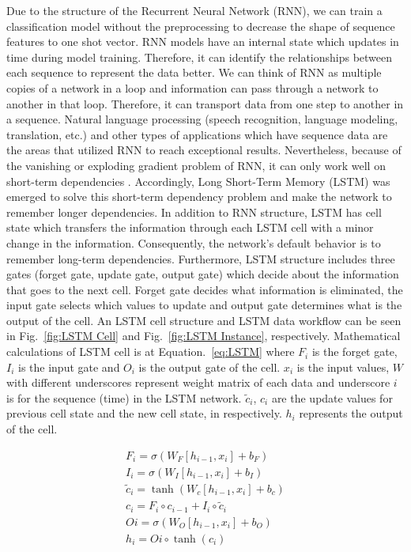 \documentclass[12pt,oneandhalf,chaparabic,lfm,phd,eng,oneside,pntc]{gsufbe}
\begin{document}
Due to the structure of the Recurrent Neural Network (RNN), we can train a classification model without the preprocessing to decrease the shape of sequence features to one shot vector. RNN models have an internal state which updates in time during model training. Therefore, it can identify the relationships between each sequence to represent the data better. We can think of RNN as multiple copies of a network in a loop and information can pass through a network to another in that loop. Therefore, it can transport data from one step to another in a sequence. Natural language processing (speech recognition, language modeling, translation, etc.) and other types of applications which have sequence data are the areas that utilized RNN to reach exceptional results. Nevertheless, because of the vanishing or exploding gradient problem of RNN, it can only work well on short-term dependencies \cite{bengio1994learning}. Accordingly, Long Short-Term Memory (LSTM) \cite{hochreiter1997long} was emerged to solve this short-term dependency problem and make the network to remember longer dependencies. In addition to RNN structure, LSTM has cell state which transfers the information through each LSTM cell with a minor change in the information. Consequently, the network's default behavior is to remember long-term dependencies. Furthermore, LSTM structure includes three gates (forget gate, update gate, output gate) which decide about the information that goes to the next cell. Forget gate decides what information is eliminated, the input gate selects which values to update and output gate determines what is the output of the cell. An LSTM cell structure and LSTM data workflow can be seen in Fig.~\ref{fig:LSTM Cell} and Fig.~\ref{fig:LSTM Instance}, respectively. Mathematical calculations of LSTM cell is at Equation.~\ref{eq:LSTM} where $F_{i}$ is the forget gate, $I_{i}$ is the input gate and $O_{i}$ is the output gate of the cell. $x_{i}$ is the input values, $W$ with different underscores represent weight matrix of each data and underscore $i$ is for the sequence (time) in the LSTM network. $\tilde{c}_{i}$, $c_{i}$ are the update values for previous cell state and the new cell state, in respectively. $h_{i}$ represents the output of the cell.

\begin{equation}
\begin{array}{l}
{F_{i}=\sigma\left(W_{F}\left[h_{i-1}, x_{i}\right]+b_{F}\right)} \\ {I_{i}=\sigma\left(W_{I}\left[h_{i-1}, x_{i}\right]+b_{I}\right)} \\ 
{\tilde{c}_{i}=\tanh \left(W_{c}\left[h_{i-1}, x_{i}\right]+b_{c}\right)} \\ 
{c_{i}=F_{i} \circ c_{i-1}+I_{i} \circ \tilde{c}_{i}} \\ {O{i}=\sigma\left(W_{O}\left[h_{i-1}, x_{i}\right]+b_{O}\right)} \\ 
{h_{i}=O{i} \circ \tanh \left(c_{i}\right)}\end{array}
\label{eq:LSTM}
\end{equation}
\end{document}
